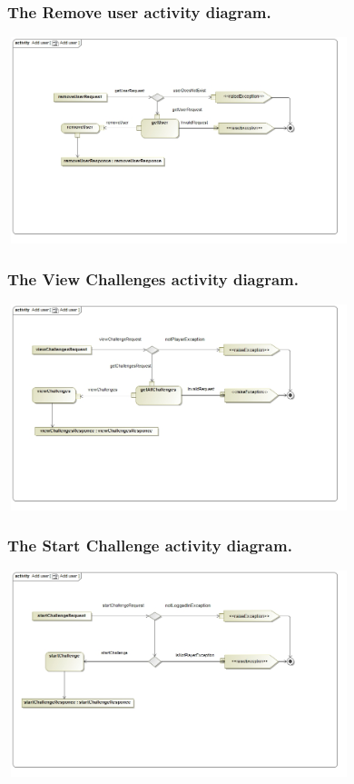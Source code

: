 \documentclass[english]{article}
\begin{document}
		 \subsubsection* {The Remove user activity diagram.}
		 \includegraphics[width=10cm,height=6cm,keepaspectratio]{RemoveUser1.jpg}	
		 
		 \subsubsection* {The View Challenges activity diagram.}
		 \includegraphics[width=10cm,height=6cm,keepaspectratio]{ViewChallenges.jpg}
		 
		  \subsubsection* {The Start Challenge activity diagram.}
		  \includegraphics[width=10cm,height=6cm,keepaspectratio]{StartChallenge1.jpg}
		  
\end{document}
